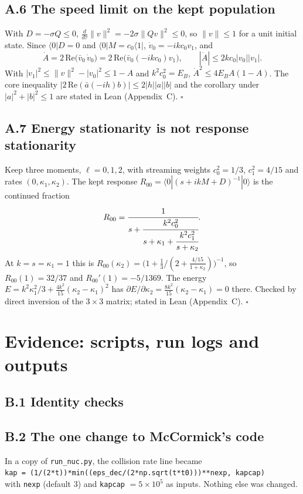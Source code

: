 \documentclass[11pt]{article}
\begin{document}
\subsection*{A.6 The speed limit on the kept population}
With $D=-\sigma Q\le0$, $\frac{d}{d\tau}\lVert v\rVert^2=-2\sigma\lVert Qv\rVert^2\le0$, so $\lVert v\rVert\le1$ for a unit initial state. Since $\langle0|D=0$ and $\langle0|M=c_0\langle1|$, $\dot v_0=-ikc_0v_1$, and
\[
\dot A=2\,\mathrm{Re}\big(\bar v_0\,\dot v_0\big)=2\,\mathrm{Re}\big(\bar v_0(-ikc_0)v_1\big),\qquad |\dot A|\le2kc_0|v_0||v_1|.
\]
With $|v_1|^2\le\lVert v\rVert^2-|v_0|^2\le1-A$ and $k^2c_0^2=E_B$, $\dot A^2\le4E_BA(1-A)$. The core inequality $|2\,\mathrm{Re}(\bar a(-ih)b)|\le2|h||a||b|$ and the corollary under $|a|^2+|b|^2\le1$ are stated in Lean (Appendix~C). $\square$
\subsection*{A.7 Energy stationarity is not response stationarity}
Keep three moments, $\ell=0,1,2$, with streaming weights $c_0^2=1/3$, $c_1^2=4/15$ and rates $(0,\kappa_1,\kappa_2)$. The kept response $R_{00}=\langle0|(s+ikM+D)^{-1}|0\rangle$ is the continued fraction
\[
R_{00}=\cfrac{1}{s+\cfrac{k^2c_0^2}{s+\kappa_1+\cfrac{k^2c_1^2}{s+\kappa_2}}} .
\]
At $k=s=\kappa_1=1$ this is $R_{00}(\kappa_2)=\big(1+\tfrac13/(2+\tfrac{4/15}{1+\kappa_2})\big)^{-1}$, so $R_{00}(1)=32/37$ and $R_{00}'(1)=-5/1369$. The energy $E=k^2\kappa_1^2/3+\tfrac{4k^2}{15}(\kappa_2-\kappa_1)^2$ has $\partial E/\partial\kappa_2=\tfrac{8k^2}{15}(\kappa_2-\kappa_1)=0$ there. Checked by direct inversion of the $3\times3$ matrix; stated in Lean (Appendix~C). $\square$

\section{Evidence: scripts, run logs and outputs}
\subsection*{B.1 Identity checks}


\subsection*{B.2 The one change to McCormick's code}
In a copy of \texttt{run\_nuc.py}, the collision rate line became\\
\texttt{kap = (1/(2*t))*min((eps\_dec/(2*np.sqrt(t*t0)))**nexp, kapcap)}\\
with \texttt{nexp} (default 3) and \texttt{kapcap} $=5\times10^5$ as inputs. Nothing else was changed.


\end{document}
